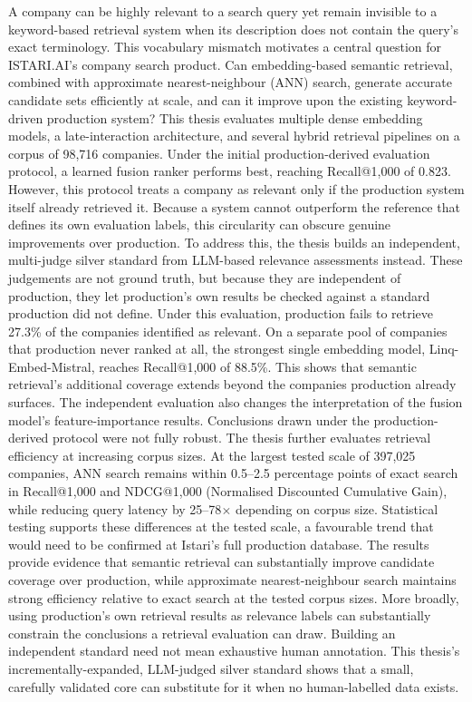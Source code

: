 \documentclass[a4paper,oneside,bibliography=totoc]{scrbook}
\begin{document}
A company can be highly relevant to a search query yet remain invisible to a keyword-based retrieval system when its description does not contain the query's exact terminology. This vocabulary mismatch motivates a central question for ISTARI.AI's company search product. Can embedding-based semantic retrieval, combined with approximate nearest-neighbour (ANN) search, generate accurate candidate sets efficiently at scale, and can it improve upon the existing keyword-driven production system? This thesis evaluates multiple dense embedding models, a late-interaction architecture, and several hybrid retrieval pipelines on a corpus of 98,716 companies. Under the initial production-derived evaluation protocol, a learned fusion ranker performs best, reaching Recall@1{,}000 of 0.823. However, this protocol treats a company as relevant only if the production system itself already retrieved it. Because a system cannot outperform the reference that defines its own evaluation labels, this circularity can obscure genuine improvements over production. To address this, the thesis builds an independent, multi-judge silver standard from LLM-based relevance assessments instead. These judgements are not ground truth, but because they are independent of production, they let production's own results be checked against a standard production did not define. Under this evaluation, production fails to retrieve 27.3\% of the companies identified as relevant. On a separate pool of companies that production never ranked at all, the strongest single embedding model, Linq-Embed-Mistral, reaches Recall@1{,}000 of 88.5\%. This shows that semantic retrieval's additional coverage extends beyond the companies production already surfaces. The independent evaluation also changes the interpretation of the fusion model's feature-importance results. Conclusions drawn under the production-derived protocol were not fully robust. The thesis further evaluates retrieval efficiency at increasing corpus sizes. At the largest tested scale of 397,025 companies, ANN search remains within 0.5--2.5 percentage points of exact search in Recall@1{,}000 and NDCG@1{,}000 (Normalised Discounted Cumulative Gain), while reducing query latency by 25--78$\times$ depending on corpus size. Statistical testing supports these differences at the tested scale, a favourable trend that would need to be confirmed at Istari's full production database. The results provide evidence that semantic retrieval can substantially improve candidate coverage over production, while approximate nearest-neighbour search maintains strong efficiency relative to exact search at the tested corpus sizes. More broadly, using production's own retrieval results as relevance labels can substantially constrain the conclusions a retrieval evaluation can draw. Building an independent standard need not mean exhaustive human annotation. This thesis's incrementally-expanded, LLM-judged silver standard shows that a small, carefully validated core can substitute for it when no human-labelled data exists.
\end{document}
